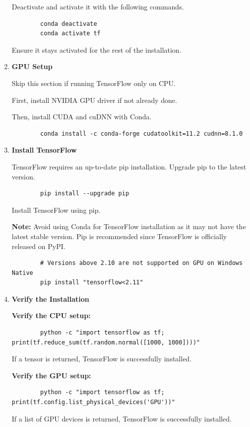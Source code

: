 \begin{enumerate}
	Deactivate and activate it with the following commands.
	
	\begin{verbatim}
		conda deactivate
		conda activate tf
	\end{verbatim}
	
	Ensure it stays activated for the rest of the installation.
	
	\item \textbf{GPU Setup}
	
	Skip this section if running TensorFlow only on CPU.
	
	First, install NVIDIA GPU driver if not already done.
	
	Then, install CUDA and cuDNN with Conda.
	
	\begin{verbatim}
		conda install -c conda-forge cudatoolkit=11.2 cudnn=8.1.0
	\end{verbatim}
	
	\item \textbf{Install TensorFlow}
	
	TensorFlow requires an up-to-date pip installation. Upgrade pip to the latest version.
	
	\begin{verbatim}
		pip install --upgrade pip
	\end{verbatim}
	
	Install TensorFlow using pip.
	
	\textbf{Note:} Avoid using Conda for TensorFlow installation as it may not have the latest stable version. Pip is recommended since TensorFlow is officially released on PyPI.
	
	\begin{verbatim}
		# Versions above 2.10 are not supported on GPU on Windows Native
		pip install "tensorflow<2.11"
	\end{verbatim}
	
	\item \textbf{Verify the Installation}
	
	\textbf{Verify the CPU setup:}
	
	\begin{verbatim}
		python -c "import tensorflow as tf; print(tf.reduce_sum(tf.random.normal([1000, 1000])))"
	\end{verbatim}
	
	If a tensor is returned, TensorFlow is successfully installed.
	
	\textbf{Verify the GPU setup:}
	
	\begin{verbatim}
		python -c "import tensorflow as tf; print(tf.config.list_physical_devices('GPU'))"
	\end{verbatim}
	
	If a list of GPU devices is returned, TensorFlow is successfully installed.
	
\end{enumerate}

